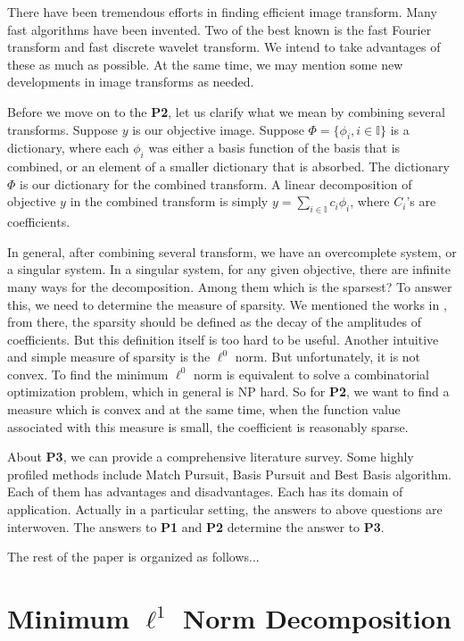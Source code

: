 \documentclass[11pt,draft]{IEEEtran} %
\begin{document}
There have been tremendous efforts in finding efficient image
transform. Many fast algorithms have been invented. Two of the best
known is the fast Fourier transform and fast discrete wavelet
transform. We intend to take advantages of these as much as
possible. At the same time, we may mention some new developments in
image transforms as needed. 

Before we move on to the {\bf P2}, let us clarify what we mean by
combining several transforms. Suppose $y$ is our objective
image. Suppose $\Phi=\{\phi_i, i\in \mathbb{I}\}$ is a dictionary, where
each $\phi_i$ was either a basis function of the basis that is
combined, or an element of a smaller dictionary that is absorbed. The
dictionary $\Phi$ is our dictionary for the combined transform. A
linear decomposition of objective $y$ in the combined transform is
simply $y = \sum_{i \in {\mathbb{I}}} c_i \phi_i$, where $C_i$'s are
coefficients.

In general, after combining several transform, we have an overcomplete 
system, or a singular system. In a singular system, for any given
objective, there are infinite many ways for the decomposition. Among
them which is the sparsest? To answer this, we need to determine the
measure of sparsity. We mentioned the works in \cite{MallatFalzon},
from there, the sparsity should be defined as the decay of the
amplitudes of coefficients. But this definition itself is too hard to
be useful. Another intuitive and simple measure of sparsity is the
$\ell^0$ norm. But unfortunately, it is not convex. To find the
minimum $\ell^0$ norm is equivalent to solve a combinatorial
optimization problem, which in general is NP hard. So for {\bf P2}, we 
want to find a measure which is convex and at the same time, when the
function value associated with this measure is small, the coefficient
is reasonably sparse. 

About {\bf P3}, we can provide a comprehensive literature survey. Some 
highly profiled methods include Match Pursuit, Basis Pursuit and Best
Basis algorithm. Each of them has advantages and disadvantages. Each
has its domain of application. Actually in a particular setting, the
answers to above questions are interwoven. The answers to {\bf P1}
and {\bf P2} determine the answer to {\bf P3}.

The rest of the paper is organized as follows...

\section{Minimum $\ell^1$ Norm Decomposition}
\end{document}
